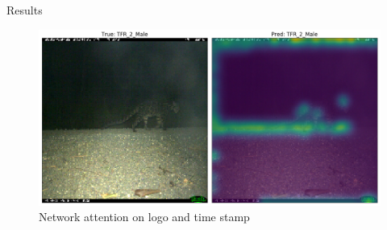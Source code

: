 \documentclass[10pt]{beamer}
\begin{document}

\begin{frame}{Results}
	\begin{figure}
		\includegraphics[width=\columnwidth]{images/Attention_Leo_Stamp2.png}
		\caption{Network attention on logo and time stamp}
	\end{figure}
\end{frame}

\end{document}
